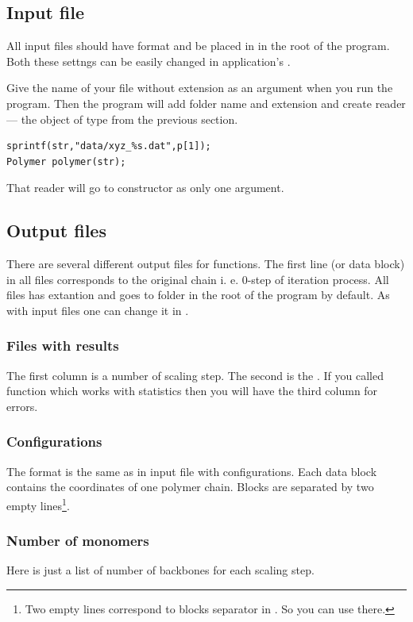 \documentclass[12pt]{article}
\begin{document}
\begin{mySection}
\subsection{Input file}\label{sec:inputFile}

All input files should have  format and be placed in  in the root of the program.  Both these settngs can be easily changed in application's .

Give the name of your file without extension as an argument when you run the program. Then the program will add folder name and extension and create reader — the object of type from the previous section.
\begin{lstlisting}
sprintf(str,"data/xyz_%s.dat",p[1]);
Polymer polymer(str);
\end{lstlisting}

That reader will go to  constructor as only one argument.


\subsection{Output files}\label{ssec:outputFiles}
There are several different output files for  functions. The first line (or data block) in all files corresponds to the original chain i. e. 0-step of iteration process.
All files has  extantion and goes to  folder in the root of the program by default. As with input files one can change it in .

\subsubsection{Files with results}
The first column is a number of scaling step. The second is the . If you called   function which works with statistics then you will have the third column for errors.

\subsubsection{Configurations}
The format is the same as in input file with configurations. Each data block contains the coordinates of one polymer chain. Blocks are separated by two empty lines\footnote{Two empty lines correspond to blocks separator in . So you can use  there.}.

\subsubsection{Number of monomers}
Here is just a list of number of backbones for each scaling step. 


\end{mySection}
\end{document}
